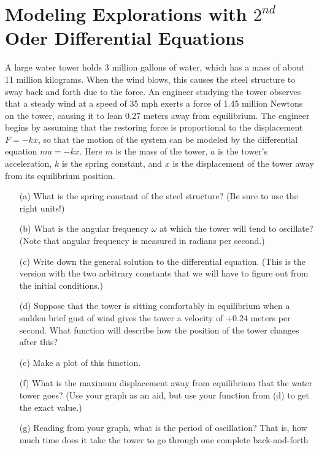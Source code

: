 \section{Modeling Explorations with $2^{nd}$ Oder Differential Equations}
\begin{problem}
    A large water tower holds 3 million gallons of water, which has a mass of about 11
    million kilograms.  When the wind blows, this causes the steel structure to sway back
    and forth due to the force.  An engineer studying the tower observes that a steady
    wind at a speed of 35 mph exerts a force of 1.45 million Newtons on the tower, causing
    it to lean 0.27 meters away from equilibrium.  The engineer begins by assuming that
    the restoring force is proportional to the displacement $F = - k x$, so that the motion
    of the system can be modeled by the differential equation $m a = -k x$.  Here $m$ is the
    mass of the tower, $a$ is the tower's acceleration, $k$ is the spring constant, and $x$ is
    the displacement of the tower away from its equilibrium position.
    \begin{enumerate}
        \item[(a)] What is the spring constant of the steel structure?  (Be sure to
            use the right units!)
        \item[(b)] What is the angular frequency $\omega$ at which the tower will tend to oscillate?
            (Note that angular frequency is measured in radians per second.)
        \item[(c)] Write down the general solution to the differential equation.  (This is
            the version with the two arbitrary constants that we will have to figure out
            from the initial conditions.)
        \item[(d)] Suppose that the tower is sitting comfortably in equilibrium when a sudden
            brief gust of wind gives the tower a velocity of $+0.24$ meters per second.
            What function will describe how the position of the tower changes after this?
        \item[(e)] Make a plot of this function.
        \item[(f)] What is the maximum displacement away from equilibrium that the water
            tower goes? (Use your graph as an aid, but use your function from (d) to get
            the exact value.)
        \item[(g)] Reading from your graph, what is the period of oscillation?  That is, how
            much time does it take the tower to go through one complete back-and-forth

\end{enumerate}
\end{problem}
